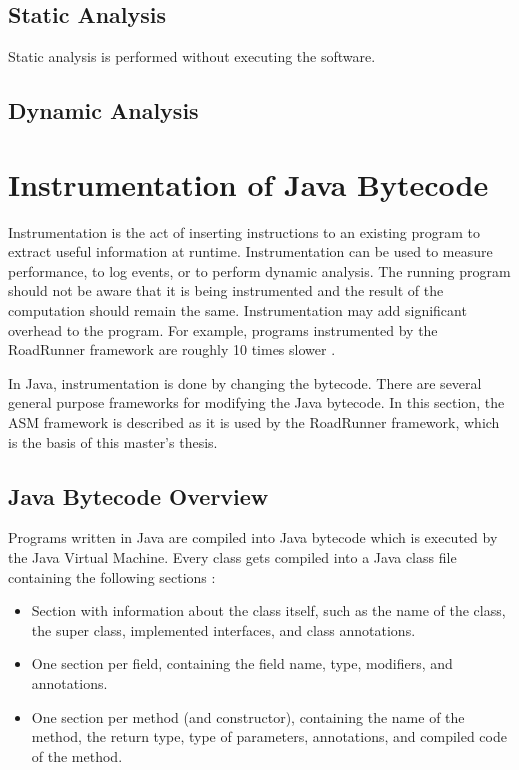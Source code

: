 \subsection{Static Analysis}

Static analysis is performed without executing the software.

\todo{}

\subsection{Dynamic Analysis}

\todo{}


\section{Instrumentation of Java Bytecode}

Instrumentation is the act of inserting instructions to an existing program to
extract useful information at runtime. Instrumentation can be used to measure
performance, to log events, or to perform dynamic analysis. The running program
should not be aware that it is being instrumented and the result of the
computation should remain the same.  Instrumentation may add significant
overhead to the program. For example, programs instrumented by the RoadRunner
framework are roughly 10 times slower \cite{RoadRunner}.

In Java, instrumentation is done by changing the bytecode. There are several
general purpose frameworks for modifying the Java bytecode. In this section, the
ASM framework is described as it is used by the RoadRunner framework, which is
the basis of this master's thesis.

\subsection{Java Bytecode Overview}

Programs written in Java are compiled into Java bytecode which is executed by
the Java Virtual Machine. Every class gets compiled into a Java class file
containing the following sections \cite{asmguide}:
\begin{itemize}
    \item Section with information about the class itself, such as the name of
    the class, the super class, implemented interfaces, and class annotations.
    \item One section per field, containing the field name, type, modifiers, and
    annotations.
    \item One section per method (and constructor), containing the name of the
    method, the return type, type of parameters, annotations, and compiled code
    of the method.
\end{itemize}

